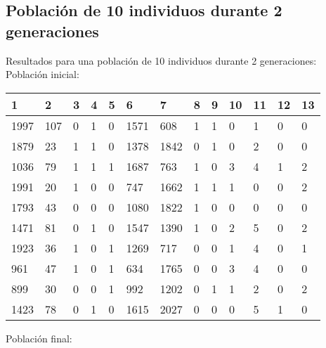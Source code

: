 \subsection{Población de 10 individuos durante 2 generaciones}
Resultados para una población de 10 individuos durante 2 generaciones:
Población inicial:
\begin{table}[H]
\begin{tabular}{|l|l|l|l|l|l|l|l|l|l|l|l|l|}
\hline
\textbf{1} & \textbf{2} & \textbf{3} & \textbf{4} & \textbf{5} & \textbf{6} & \textbf{7} & \textbf{8} & \textbf{9} & \textbf{10} & \textbf{11} & \textbf{12} & \textbf{13} \\ \hline
1997  &  107  &  0  &  1  &  0  &  1571  &  608  &  1  &  1  &  0  &  1  &  0  &  0 \\ \hline
1879  &  23  &  1  &  1  &  0  &  1378  &  1842  &  0  &  1  &  0  &  2  &  0  &  0 \\ \hline
1036  &  79  &  1  &  1  &  1  &  1687  &  763  &  1  &  0  &  3  &  {\color[HTML]{FE0000}4}  &  1  &  2 \\ \hline
1991  &  20  &  1  &  0  &  0  &  747  &  1662  &  1  &  1  &  1  &  0  &  0  &  2 \\ \hline
1793  &  43  &  0  &  0  &  0  &  1080  &  1822  &  1  &  0  &  0  &  0  &  0  &  0 \\ \hline
1471  &  81  &  0  &  1  &  0  &  1547  &  1390  &  1  &  0  &  2  &  {\color[HTML]{FE0000}5}  &  0  &  2 \\ \hline
1923  &  36  &  1  &  0  &  1  &  1269  &  717  &  0  &  0  &  1  &  {\color[HTML]{FE0000}4}  &  0  &  1 \\ \hline
961  &  47  &  1  &  0  &  1  &  634  &  1765  &  0  &  0  &  3  &  {\color[HTML]{FE0000}4}  &  0  &  0 \\ \hline
899  &  30  &  0  &  0  &  1  &  992  &  1202  &  0  &  1  &  1  &  2  &  0  &  2 \\ \hline
1423  &  78  &  0  &  1  &  0  &  1615  &  2027  &  0  &  0  &  0  &  {\color[HTML]{FE0000}5}  &  1  &  0 \\ \hline
\end{tabular}
\end{table}
Población final:
